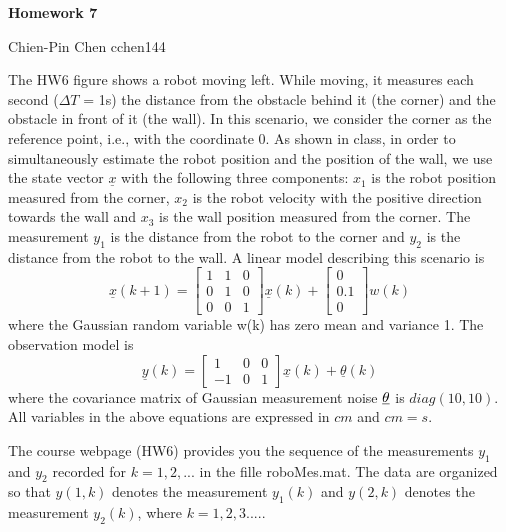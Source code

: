 \documentclass{article}
\begin{document}
 
\begin{center}
{\bf \Large  Homework 7} \\
\end{center}
Chien-Pin Chen
cchen144

The HW6 figure shows a robot moving left. While moving, it measures each second ($\Delta T$ = 1s) the distance from the obstacle behind it (the corner) and the obstacle
in front of it (the wall). In this scenario, we consider the corner as the reference
point, i.e., with the coordinate 0. As shown in class, in order to simultaneously
estimate the robot position and the position of the wall, we use the state vector
$\underline{x}$ with the following three components: $x_1$ is the robot position measured from
the corner, $x_2$ is the robot velocity with the positive direction towards the wall
and $x_3$ is the wall position measured from the corner. The measurement $y_1$ is
the distance from the robot to the corner and $y_2$ is the distance from the robot
to the wall. A linear model describing this scenario is
\begin{equation}
  \underline{x}(k+1)=\left[ 
  \begin{array}{ccc}
     1 & 1 & 0  \\
     0 & 1 & 0  \\
     0 & 0 & 1 
  \end{array}
   \right] \underline{x}(k)+ \left[
     \begin{array}{c}
     0   \\
     0.1   \\
     0
  \end{array}
   \right] w(k)
\end{equation}
where the Gaussian random variable w(k) has zero mean and variance 1. The
observation model is
\begin{equation}
 \underline{y}(k) =\left[
     \begin{array}{ccc}
     1 & 0 &  0  \\
     -1 & 0 & 1   
  \end{array}
   \right] \underline{x}(k)+\underline{\theta}(k)
\end{equation}
where the covariance matrix of Gaussian measurement noise $\underbar{$\theta$}$ 
is $diag(10, 10)$. All variables in the above equations are expressed in $cm$ and $cm=s$.

The course webpage (HW6) provides you the sequence of the measurements
$y_1$ and $y_2$ recorded for $k = 1, 2,...$ in the fille roboMes.mat. The data are
organized so that $y(1, k)$ denotes the measurement $y_1(k)$ and $y(2, k)$ 
denotes the measurement $y_2(k)$, where $k=1,2,3....$. 
\end{document}
